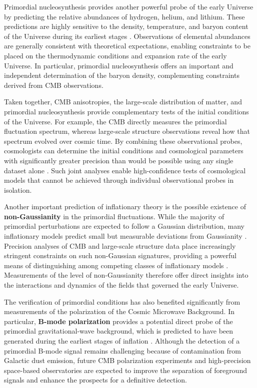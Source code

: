 Primordial nucleosynthesis provides another powerful probe of the early Universe by predicting the relative abundances of hydrogen, helium, and lithium. These predictions are highly sensitive to the density, temperature, and baryon content of the Universe during its earliest stages \cite{schramm1998}. Observations of elemental abundances are generally consistent with theoretical expectations, enabling constraints to be placed on the thermodynamic conditions and expansion rate of the early Universe. In particular, primordial nucleosynthesis offers an important and independent determination of the baryon density, complementing constraints derived from CMB observations.

Taken together, CMB anisotropies, the large-scale distribution of matter, and primordial nucleosynthesis provide complementary tests of the initial conditions of the Universe. For example, the CMB directly measures the primordial fluctuation spectrum, whereas large-scale structure observations reveal how that spectrum evolved over cosmic time. By combining these observational probes, cosmologists can determine the initial conditions and cosmological parameters with significantly greater precision than would be possible using any single dataset alone \cite{tegmark2004,komatsu2011}. Such joint analyses enable high-confidence tests of cosmological models that cannot be achieved through individual observational probes in isolation.

Another important prediction of inflationary theory is the possible existence of \textbf{non-Gaussianity} in the primordial fluctuations. While the majority of primordial perturbations are expected to follow a Gaussian distribution, many inflationary models predict small but measurable deviations from Gaussianity \cite{bartolo2004}. Precision analyses of CMB and large-scale structure data place increasingly stringent constraints on such non-Gaussian signatures, providing a powerful means of distinguishing among competing classes of inflationary models \cite{planck2020,akrami2020,meerburg2019}. Measurements of the level of non-Gaussianity therefore offer direct insights into the interactions and dynamics of the fields that governed the early Universe.

The verification of primordial conditions has also benefited significantly from measurements of the polarization of the Cosmic Microwave Background. In particular, \textbf{B-mode polarization} provides a potential direct probe of the primordial gravitational-wave background, which is predicted to have been generated during the earliest stages of inflation \cite{kamionkowski2016}. Although the detection of a primordial B-mode signal remains challenging because of contamination from Galactic dust emission, future CMB polarization experiments and high-precision space-based observatories are expected to improve the separation of foreground signals and enhance the prospects for a definitive detection.

